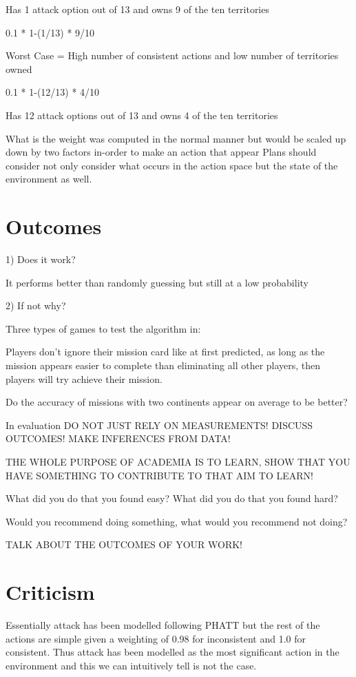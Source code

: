 \documentclass[parskip]{cs4rep}
\begin{document}
Has 1 attack option out of 13 and owns 9 of the ten territories

0.1 * 1-(1/13) * 9/10 

Worst Case = High number of consistent actions and low number of territories owned

0.1 * 1-(12/13) * 4/10 

Has 12 attack options out of 13 and owns 4 of the ten territories

What is the weight was computed in the normal manner but would be scaled up down by two factors in-order to make an action that appear
Plans should consider not only consider what occurs in the action space but the state of the environment as well.

\section{Outcomes}

1) Does it work?

It performs better than randomly guessing but still at a low probability

2) If not why?

Three types of games to test the algorithm in:

Players don't ignore their mission card like at first predicted, as long as the mission appears easier to complete than eliminating all other players, then players will try achieve their mission.

Do the accuracy of missions with two continents appear on average to be better?

In evaluation DO NOT JUST RELY ON MEASUREMENTS! DISCUSS OUTCOMES! MAKE INFERENCES FROM DATA!

THE WHOLE PURPOSE OF ACADEMIA IS TO LEARN, SHOW THAT YOU HAVE SOMETHING TO CONTRIBUTE TO THAT AIM TO LEARN!

What did you do that you found easy? What did you do that you found hard? 

Would you recommend doing something, what would you recommend not doing?

TALK ABOUT THE OUTCOMES OF YOUR WORK!

\section{Criticism}

Essentially attack has been modelled following PHATT but the rest of the actions are simple given a weighting of 0.98 for inconsistent and 1.0 for consistent. Thus attack has been modelled as the most significant action in the environment and this we can intuitively tell is not the case.
\end{document}
